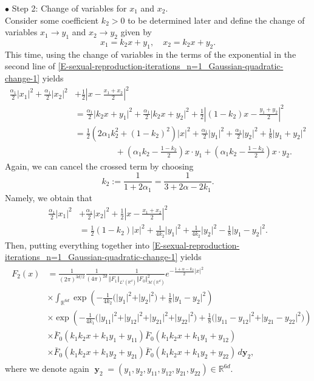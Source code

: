 \documentclass[reqno]{amsart}
\DeclareMathOperator{\by}{\mathbf{y}}
\numberwithin{equation}{section}
\begin{document}
{\medskip

$\bullet$ {\sc Step 2:} Change of variables for $x_1$ and $x_2$.\\
Consider some coefficient $k_2>0$ to be determined later and define the change of variables $x_1\rightarrow y_1$ and $x_2\rightarrow y_2$ given by
$$
x_1=k_2x+y_1,\quad x_2=k_2x+y_2.
$$
This time, using the change of variables in the terms of the exponential in the second line of \eqref{E-sexual-reproduction-iterations_n=1_Gaussian-quadratic-change-1} yields
\begin{align*}
\frac{\alpha_1}{2}\vert x_1\vert^2+\frac{\alpha_1}{2}\vert x_2\vert^2&+\frac{1}{2}\left\vert x-\frac{x_1+x_2}{2}\right\vert^2\\
&=\frac{\alpha_1}{2}\vert k_2x+y_1\vert^2+\frac{\alpha_1}{2}\vert k_2 x+y_2\vert^2+\frac{1}{2}\left\vert (1-k_2)x-\frac{y_1+y_2}{2}\right\vert^2\\
&=\frac{1}{2}\left(2\alpha_1 k_2^2+(1-k_2)^2\right)\vert x\vert^2+\frac{\alpha_1}{2}\vert y_1\vert^2+\frac{\alpha_1}{2}\vert y_2\vert^2+\frac{1}{8}\vert y_1+y_2\vert^2\\
&\hspace{2cm} +\left(\alpha_1 k_2-\frac{1-k_2}{2}\right)x\cdot y_1+\left(\alpha_1 k_2-\frac{1-k_2}{2}\right)x\cdot y_2.
\end{align*}
Again, we can cancel the crossed term by choosing
$$k_2:=\frac{1}{1+2\alpha_1}=\frac{1}{3+2\alpha-2k_1}.$$
Namely, we obtain that
\begin{align*}
\frac{\alpha_1}{2}\vert x_1\vert^2&+\frac{\alpha_1}{2}\vert x_2\vert^2+\frac{1}{2}\left\vert x-\frac{x_1+x_2}{2}\right\vert^2\\
&=\frac{1}{2}(1-k_2)\vert x\vert^2+\frac{1}{4 k_2}\vert y_1\vert^2+\frac{1}{4 k_2}\vert y_2\vert^2-\frac{1}{8}\vert y_1-y_2\vert^2.
\end{align*}
Then, putting everything together into \eqref{E-sexual-reproduction-iterations_n=1_Gaussian-quadratic-change-1} yields
\begin{align}\label{E-sexual-reproduction-iterations_n=1_Gaussian-quadratic-change-2}
\begin{aligned}
F_2(x)&=\frac{1}{(2\pi)^{3d/2}}\frac{1}{(4\pi)^{2d}}\frac{1}{\Vert F_1\Vert_{L^1(\mathbb{R}^d)}\Vert F_0\Vert_{\mathcal{M}(\mathbb{R}^d)}^2}e^{-\frac{1+\alpha-k_2}{2}\vert x\vert^2}\\
&\times \int_{\mathbb{R}^{6d}} \exp\left(-\frac{1}{4 k_2}\big(\vert y_1\vert^2+\vert y_2\vert^2\big)+\frac{1}{8}\vert y_1-y_2\vert^2\right)\\
&\times \exp\left(-\frac{1}{4 k_1}\big(\vert y_{11}\vert^2+\vert y_{12}\vert^2+\vert y_{21}\vert^2+\vert y_{22}\vert^2\big)+\frac{1}{8}\big(\vert y_{11}-y_{12}\vert^2+\vert y_{21}-y_{22}\vert^2\big)\right)\\
&\times \bar{F}_0(k_1k_2x+k_1y_1+y_{11})\bar{F}_0(k_1k_2x+k_1 y_1+y_{12})\\
&\times \bar{F}_0(k_1k_2x+k_1y_2+y_{21})\bar{F}_0(k_1k_2x+k_1y_2+y_{22})\,d\mathbf{y}_2,
\end{aligned}
\end{align}
where we denote again $\by_2=(y_1,y_2,y_{11},y_{12},y_{21},y_{22})\in \mathbb{R}^{6d}$. 

}
\end{document}
